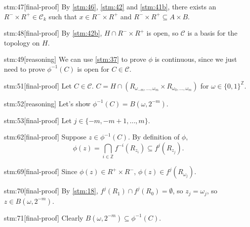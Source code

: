 \documentclass{article}
\begin{document}
\begin{stm}{stm:47}[final-proof]
By \ref{stm:46}, \ref{stm:42} and \ref{stm:41b}, there exists an $R^- \times R^+ \in \mathcal{C}_k$ such that $x \in R^- \times R^+$ and $R^- \times R^+ \subseteq A \times B$.
\end{stm}

\begin{stm}{stm:48}[final-proof]
By \ref{stm:42b}, $H \cap R^- \times R^+$ is open, so $\mathcal{C}$ is a basis for the topology on $H$.
\end{stm}

\begin{stm}{stm:49}[reasoning]
We can use \ref{stm:37} to prove $\phi$ is continuous, since we just need to prove $\phi^{-1}(C)$ is open for $C \in \mathcal{C}$.
\end{stm}

\begin{stm}{stm:51}[final-proof]
Let $C \in \mathcal{C}$. $C = H \cap (R_{\omega_{-m}, \ldots, \omega_m} \times R_{\omega_0, \ldots, \omega_m})$ for $\omega \in \{0,1\}^{\mathbb{Z}}$.
\end{stm}

\begin{stm}{stm:52}[reasoning]
Let's show $\phi^{-1}(C) = B(\omega, 2^{-m})$.
\end{stm}

\begin{stm}{stm:53}[final-proof]
Let $j \in \{-m, -m+1, \ldots, m\}$.
\end{stm}

\begin{stm}{stm:62}[final-proof]
Suppose $z \in \phi^{-1}(C)$. By definition of $\phi$,
\[
\phi(z) = \bigcap_{i \in \mathbb{Z}} f^{-i}(R_{z_i}) \subseteq f^j(R_{z_j}).
\]
\end{stm}

\begin{stm}{stm:69}[final-proof]
Since $\phi(z) \in R^+ \times R^-$, $\phi(z) \in f^j(R_{\omega_j})$. 
\end{stm}

\begin{stm}{stm:70}[final-proof]
By \ref{stm:18}, $f^j(R_1) \cap f^j(R_0) = \emptyset$, so $z_j = \omega_j$, so $z \in B(\omega, 2^{-m})$.
\end{stm}

\begin{stm}{stm:71}[final-proof]
Clearly $B(\omega, 2^{-m}) \subseteq \phi^{-1}(C)$.
\end{stm}
\end{document}
